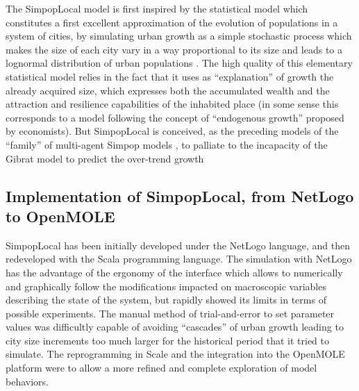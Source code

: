 \documentclass[10pt]{article}
\begin{document}
The SimpopLocal model is first inspired by the statistical model which constitutes a first excellent approximation of the evolution of populations in a system of cities, by simulating urban growth as a simple stochastic process which makes the size of each city vary in a way proportional to its size and leads to a lognormal distribution of urban populations \citep{gibrat1931inegalites}. The high quality of this elementary statistical model relies in the fact that it uses as ``explanation'' of growth the already acquired size, which expresses both the accumulated wealth and the attraction and resilience capabilities of the inhabited place (in some sense this corresponds to a model following the concept of ``endogenous growth'' proposed by economists). But SimpopLocal is conceived, as the preceding models of the ``family'' of multi-agent Simpop models \citep{bura1996multiagent,sanders2007artificial}, to palliate to the incapacity of the Gibrat model to predict the over-trend growth



\subsection{Implementation of SimpopLocal, from NetLogo to OpenMOLE}


SimpopLocal has been initially developed under the NetLogo language, and then redeveloped with the Scala programming language. The simulation with NetLogo has the advantage of the ergonomy of the interface which allows to numerically and graphically follow the modifications impacted on macroscopic variables describing the state of the system, but rapidly showed its limits in terms of possible experiments. The manual method of trial-and-error to set parameter values was difficultly capable of avoiding ``cascades'' of urban growth leading to city size increments too much larger for the historical period that it tried to simulate. The reprogramming in Scale and the integration into the OpenMOLE platform were to allow a more refined and complete exploration of model behaviors.
\end{document}
